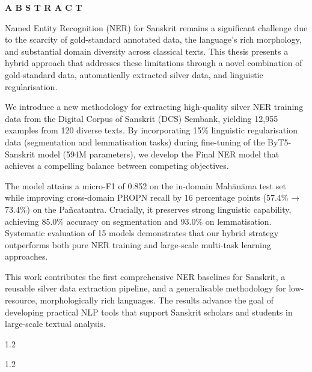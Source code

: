 \documentclass[12pt, a4paper]{report}
\begin{document}







\newpage
{}
\begin{center}
	{\bf A B S T R A C T}
\end{center}

\vspace{0.8cm}

Named Entity Recognition (NER) for Sanskrit remains a significant challenge due to the scarcity of gold-standard annotated data, the language's rich morphology, and substantial domain diversity across classical texts. This thesis presents a hybrid approach that addresses these limitations through a novel combination of gold-standard data, automatically extracted silver data, and linguistic regularisation.

We introduce a new methodology for extracting high-quality silver NER training data from the Digital Corpus of Sanskrit (DCS) Sembank, yielding 12,955 examples from 120 diverse texts. By incorporating 15\% linguistic regularisation data (segmentation and lemmatisation tasks) during fine-tuning of the ByT5-Sanskrit model (594M parameters), we develop the Final NER model that achieves a compelling balance between competing objectives.

The model attains a micro-F1 of 0.852 on the in-domain Mahānāma test set while improving cross-domain PROPN recall by 16 percentage points (57.4\% → 73.4\%) on the Pañcatantra. Crucially, it preserves strong linguistic capability, achieving 85.0\% accuracy on segmentation and 93.0\% on lemmatisation. Systematic evaluation of 15 models demonstrates that our hybrid strategy outperforms both pure NER training and large-scale multi-task learning approaches.

This work contributes the first comprehensive NER baselines for Sanskrit, a reusable silver data extraction pipeline, and a generalisable methodology for low-resource, morphologically rich languages. The results advance the goal of developing practical NLP tools that support Sanskrit scholars and students in large-scale textual analysis.

\tableofcontents

\begin{spacing}{1.2}
    \listoffigures
\end{spacing}

\begin{spacing}{1.2}
    \listoftables
\end{spacing}
\clearpage
{}











\end{document}
